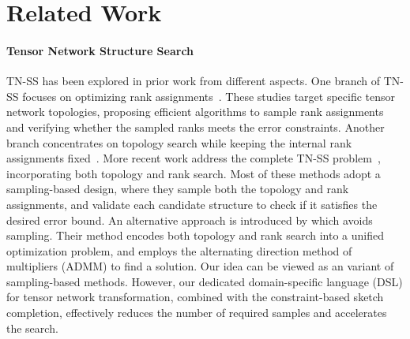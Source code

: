 \section{Related Work}\label{sec:related}
\paragraph{Tensor Network Structure Search}
%
TN-SS has been explored in prior work from different aspects.
%
One branch of TN-SS focuses on optimizing rank assignments~\cite{pmlr-v32-rai14,mickelin2020algorithms,Sedighin2021Adaptive,Yin_Phan_Zang_Liao_Yuan_2022,pmlr-v202-ghadiri23a}.
%
These studies target specific tensor network topologies, proposing efficient algorithms to sample rank assignments and verifying whether the sampled ranks meets the error constraints.
%
Another branch concentrates on topology search while keeping the internal rank assignments fixed~\cite{hashemizadeh2020adaptive,Li_Sun_2020,PhysRevResearch.5.013031,Haberstich23}.
%
More recent work address the complete TN-SS problem~\cite{Li_Zeng_Tao_Zhao_2022,Li_Zeng_Li_Caiafa_Zhao_2023,zheng2024svdinstn,zengtngps}, incorporating both topology and rank search.
%
Most of these methods adopt a sampling-based design, where they sample both the topology and rank assignments, and validate each candidate structure to check if it satisfies the desired error bound.
%
An alternative approach is introduced by \citet{zheng2024svdinstn} which avoids sampling.
%
Their method encodes both topology and rank search into a unified optimization problem, and employs the alternating direction method of multipliers (ADMM) to find a solution.
%
Our idea can be viewed as an variant of sampling-based methods.
%
However, our dedicated domain-specific language (DSL) for tensor network transformation, combined with the constraint-based sketch completion, effectively reduces the number of required samples and accelerates the search.
%
